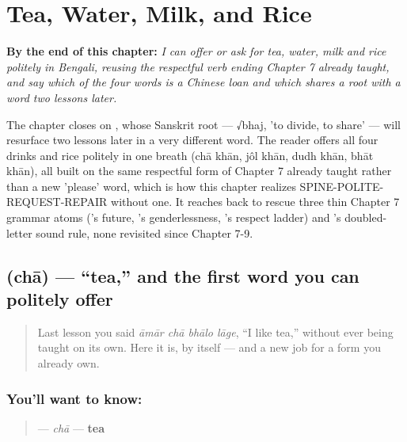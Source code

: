 
\chapter{Tea, Water, Milk, and Rice}
\label{ch:bn-tea-water-milk-rice}

\begin{chapteropening}
\textbf{By the end of this chapter:} \emph{I can offer or ask for tea, water, milk and rice politely in Bengali, reusing the respectful verb ending Chapter 7 already taught, and say which of the four words is a Chinese loan and which shares a root with a word two lessons later.}

The chapter closes on , whose Sanskrit root — √bhaj, 'to divide, to share' — will resurface two lessons later in a very different word. The reader offers all four drinks and rice politely in one breath (chā khān, jôl khān, dudh khān, bhāt khān), all built on the same respectful form of  Chapter 7 already taught rather than a new 'please' word, which is how this chapter realizes SPINE-POLITE-REQUEST-REPAIR without one. It reaches back to rescue three thin Chapter 7 grammar atoms ('s future, 's genderlessness, 's respect ladder) and 's doubled-letter sound rule, none revisited since Chapter 7-9.
\end{chapteropening}

\section[\texorpdfstring{\bn{চা} (chā)}{চা (chā)}]{ (chā) — \textquotedblleft{}tea,\textquotedblright{} and the first word you can politely offer}

\label{lesson:BN-C10-cha}



\begin{quote}
Last lesson you said \emph{āmār chā bhālo lāge}, \textquotedblleft{}I like tea,\textquotedblright{} without  ever being taught on its own. Here it is, by itself — and a new job for a form you already own.
\end{quote}

\subsection*{You'll want to know: }
\begin{quote}
\textbf{} — \emph{chā} — \textbf{tea}
\end{quote}

